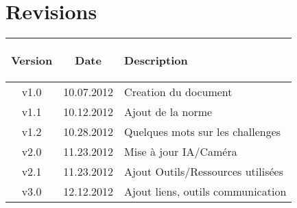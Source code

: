 \part*{Revisions}

%
%

\begin{tabular}{|c|c|C{7.5cm}|}
	\hline
		\begin{bf}Version\end{bf} & \begin{bf}Date\end{bf} & \begin{bf}Description\end{bf} \\
	\hline
		v1.0 & 10.07.2012 & Creation du document \\
	\hline
		v1.1 & 10.12.2012 & Ajout de la norme \\
	\hline
		v1.2 & 10.28.2012 & Quelques mots sur les challenges \\
	\hline
		v2.0 & 11.23.2012 & Mise à jour IA/Caméra \\
	\hline
		v2.1 & 11.23.2012 & Ajout Outils/Ressources utilisées \\
	\hline
		v3.0 & 12.12.2012 & Ajout liens, outils communication \\
	\hline
\end{tabular}